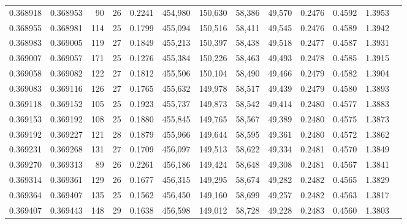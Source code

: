 \begin{tabular}{rrrrrrrrrrrrr}
0.368918 & 0.368953 &    90 &  26 &                                     0.2241 & 454,980 & 150,630 &  58,386 &  49,570 & 0.2476 & 0.4592 & 1.3953 \\
0.368955 & 0.368981 &   114 &  25 &                                     0.1799 & 455,094 & 150,516 &  58,411 &  49,545 & 0.2476 & 0.4589 & 1.3942 \\
0.368983 & 0.369005 &   119 &  27 &                                     0.1849 & 455,213 & 150,397 &  58,438 &  49,518 & 0.2477 & 0.4587 & 1.3931 \\
0.369007 & 0.369057 &   171 &  25 &                                     0.1276 & 455,384 & 150,226 &  58,463 &  49,493 & 0.2478 & 0.4585 & 1.3915 \\
0.369058 & 0.369082 &   122 &  27 &                                     0.1812 & 455,506 & 150,104 &  58,490 &  49,466 & 0.2479 & 0.4582 & 1.3904 \\
0.369083 & 0.369116 &   126 &  27 &                                     0.1765 & 455,632 & 149,978 &  58,517 &  49,439 & 0.2479 & 0.4580 & 1.3893 \\
0.369118 & 0.369152 &   105 &  25 &                                     0.1923 & 455,737 & 149,873 &  58,542 &  49,414 & 0.2480 & 0.4577 & 1.3883 \\
0.369153 & 0.369192 &   108 &  25 &                                     0.1880 & 455,845 & 149,765 &  58,567 &  49,389 & 0.2480 & 0.4575 & 1.3873 \\
0.369192 & 0.369227 &   121 &  28 &                                     0.1879 & 455,966 & 149,644 &  58,595 &  49,361 & 0.2480 & 0.4572 & 1.3862 \\
0.369231 & 0.369268 &   131 &  27 &                                     0.1709 & 456,097 & 149,513 &  58,622 &  49,334 & 0.2481 & 0.4570 & 1.3849 \\
0.369270 & 0.369313 &    89 &  26 &                                     0.2261 & 456,186 & 149,424 &  58,648 &  49,308 & 0.2481 & 0.4567 & 1.3841 \\
0.369314 & 0.369361 &   129 &  26 &                                     0.1677 & 456,315 & 149,295 &  58,674 &  49,282 & 0.2482 & 0.4565 & 1.3829 \\
0.369364 & 0.369407 &   135 &  25 &                                     0.1562 & 456,450 & 149,160 &  58,699 &  49,257 & 0.2482 & 0.4563 & 1.3817 \\
0.369407 & 0.369443 &   148 &  29 &                                     0.1638 & 456,598 & 149,012 &  58,728 &  49,228 & 0.2483 & 0.4560 & 1.3803 \\

\end{tabular}
